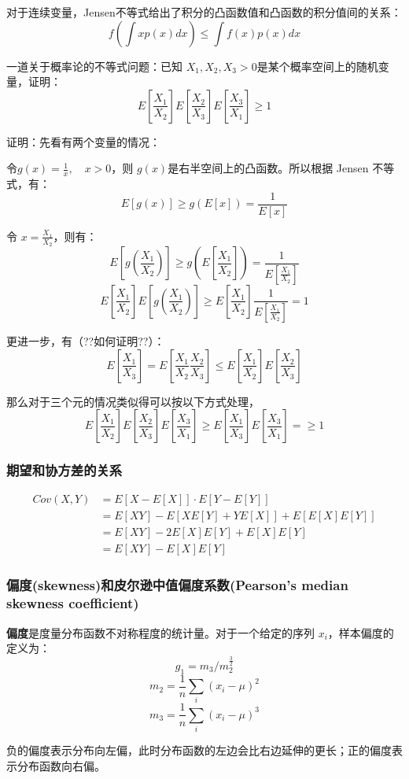 \documentclass[12pt]{article}
\begin{document}
对于连续变量，Jensen不等式给出了积分的凸函数值和凸函数的积分值间的关系：
$$
f(\int{xp(x)dx}) \le \int{f(x)p(x)dx}
$$

\begin{framed}  
\small{
一道关于概率论的不等式问题：已知 $X_1, X_2, X_3>0$是某个概率空间上的随机变量，证明：
$$
E[\frac{X_1}{X_2}]E[\frac{X_2}{X_3}]E[\frac{X_3}{X_1}] \ge 1
$$

证明：先看有两个变量的情况：

令$g(x) = \frac{1}{x}, \quad x > 0$，则 $g(x)$是右半空间上的凸函数。所以根据 Jensen 不等式，有：
$$
E[g(x)] \ge g(E[x]) = \frac{1}{E[x]}
$$

令 $x = \frac{X_1}{X_2}$，则有：
$$
E[g(\frac{X_1}{X_2})] \ge g(E[\frac{X_1}{X_2}]) = \frac{1}{E[\frac{X_1}{X_2}]}
$$
$$
E[\frac{X_1}{X_2}]E[g(\frac{X_1}{X_2})] \ge E[\frac{X_1}{X_2}]\frac{1}{E[\frac{X_1}{X_2}]} = 1
$$

更进一步，有（??如何证明??）：
$$
E[\frac{X_1}{X_3}] = E[\frac{X_1}{X_2}\frac{X_2}{X_3}] \le E[\frac{X_1}{X_2}]E[\frac{X_2}{X_3}]
$$

那么对于三个元的情况类似得可以按以下方式处理，
$$
E[\frac{X_1}{X_2}]E[\frac{X_2}{X_3}]E[\frac{X_3}{X_1}] \ge E[\frac{X_1}{X_3}]E[\frac{X_3}{X_1}] = \ge 1
$$
}
\end{framed}

\subsubsection{期望和协方差的关系}
\begin{align*}
Cov(X,Y) &= E[X - E[X]]\cdot E[Y-E[Y]] \\
    &= E[XY] - E[XE[Y]+YE[X]] + E[E[X]E[Y]] \\
    &= E[XY] - 2E[X]E[Y] + E[X]E[Y] \\
    &= E[XY] - E[X]E[Y]
\end{align*}

\subsubsection{偏度(skewness)和皮尔逊中值偏度系数(Pearson's median skewness coefficient)\cite{Think_Stats}}
\textbf{偏度}是度量分布函数不对称程度的统计量。对于一个给定的序列 $x_i$，样本偏度的定义为：
$$
g_1 = m_3 / m_2^{\frac{3}{2}}
$$
$$
m_2 = \frac{1}{n}\sum_i(x_i - \mu)^2
$$
$$
m_3 = \frac{1}{n}\sum_i(x_i - \mu)^3
$$

负的偏度表示分布向左偏，此时分布函数的左边会比右边延伸的更长；正的偏度表示分布函数向右偏。
\end{document}
